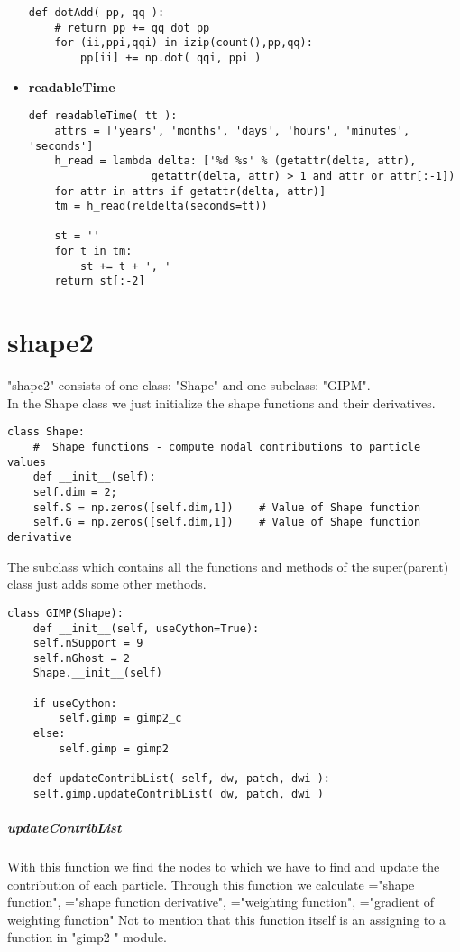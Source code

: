 \documentclass[11pt,fleqn]{book} %
\begin{document}
\begin{itemize}
\begin{lstlisting}
def dotAdd( pp, qq ):
    # return pp += qq dot pp
    for (ii,ppi,qqi) in izip(count(),pp,qq):
        pp[ii] += np.dot( qqi, ppi )  
\end{lstlisting}
\item \textbf{readableTime}
\begin{lstlisting}
def readableTime( tt ):
    attrs = ['years', 'months', 'days', 'hours', 'minutes', 'seconds']    
    h_read = lambda delta: ['%d %s' % (getattr(delta, attr), 
                   getattr(delta, attr) > 1 and attr or attr[:-1]) 
    for attr in attrs if getattr(delta, attr)]
    tm = h_read(reldelta(seconds=tt))
    
    st = ''
    for t in tm:
        st += t + ', '
    return st[:-2]
\end{lstlisting}
\end{itemize}

\chapter{shape2}
\label{chap:shape2}
"shape2" consists of one class: "Shape" and one subclass: "GIPM". \\
In the Shape class we just initialize the shape functions and their derivatives. 
\begin{lstlisting}
class Shape:
    #  Shape functions - compute nodal contributions to particle values
    def __init__(self):
	self.dim = 2;
	self.S = np.zeros([self.dim,1])    # Value of Shape function
	self.G = np.zeros([self.dim,1])    # Value of Shape function derivative	     
\end{lstlisting}

The subclass which contains all the functions and methods of the super(parent) class just adds some other methods.
\begin{lstlisting}
class GIMP(Shape):
    def __init__(self, useCython=True):
	self.nSupport = 9
	self.nGhost = 2
	Shape.__init__(self)
	
	if useCython:
	    self.gimp = gimp2_c
	else:
	    self.gimp = gimp2

    def updateContribList( self, dw, patch, dwi ):
	self.gimp.updateContribList( dw, patch, dwi )
\end{lstlisting}

\paragraph{updateContribList}
With this function we find the nodes to which we have to find and update the contribution of each particle.
Through this function we calculate  ="shape function",  ="shape function derivative",  ="weighting function",  ="gradient of weighting function"
Not to mention that this function itself is an assigning to a function in "gimp2 " module.
\end{document}
